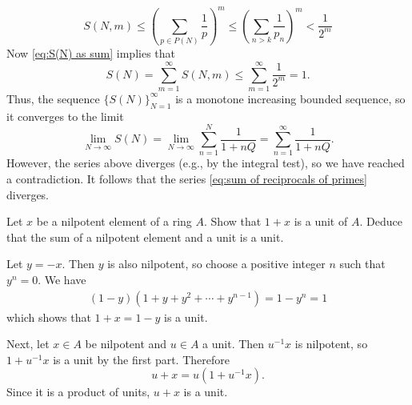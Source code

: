 \documentclass[a4paper,11pt]{ltjsarticle} %
\begin{document}
\begin{solution}
\begin{equation*}
S(N, m)
\leq \left(\sum_{p \in P(N)} \frac{1}{p}\right)^{m}
\leq \left(\sum_{n > k} \frac{1}{p_n}\right)^{m}
< \frac{1}{2^m}
\end{equation*}
Now \eqref{eq:S(N) as sum} implies that
\begin{equation*}
S(N)
= \sum_{m=1}^\infty S(N, m)
\leq \sum_{m=1}^\infty \frac{1}{2^m} = 1.
\end{equation*}
Thus, the sequence $\{S(N)\}_{N=1}^\infty$ is a monotone increasing bounded
sequence, so it converges to the limit
\begin{equation*}
\lim_{N \to \infty} S(N)
= \lim_{N \to \infty} \sum_{n=1}^N \frac{1}{1 + n Q}
= \sum_{n=1}^\infty \frac{1}{1 + n Q}.
\end{equation*}
However, the series above diverges (e.g., by the integral test), so we have
reached a contradiction.
It follows that the series \eqref{eq:sum of reciprocals of primes} diverges.
\end{solution}

\begin{problem}
Let $x$ be a nilpotent element of a ring $A$.
Show that $1 + x$ is a unit of $A$.
Deduce that the sum of a nilpotent element and a unit is a unit.
\end{problem}

\begin{solution}
Let $y = -x$.
Then $y$ is also nilpotent, so choose a positive integer $n$ such that
$y^n = 0$.
We have
\begin{align*}
(1 - y) (1 + y + y^2 + \cdots + y^{n-1})
= 1 - y^n
= 1
\end{align*}
which shows that $1 + x = 1 - y$ is a unit.

Next, let $x\in A$ be nilpotent and $u\in A$ a unit.
Then $u^{-1} x$ is nilpotent, so $1 + u^{-1}x$ is a unit by the first part.
Therefore
\begin{equation*}
u + x = u(1 + u^{-1} x).
\end{equation*}
Since it is a product of units, $u + x$ is a unit.
\end{solution}
\end{document}
